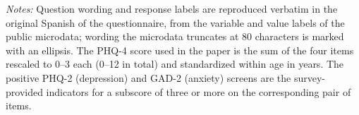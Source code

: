 \begin{table}[htbp]
\begin{threeparttable}
\begin{tabular}{@{}p{68pt}p{212pt}p{150pt}@{}}
\bottomrule
\end{tabular}
\begin{wpnotes}
\textit{Notes:} Question wording and response labels are reproduced verbatim in the original Spanish of the questionnaire, from the variable and value labels of the public microdata; wording the microdata truncates at 80 characters is marked with an ellipsis. The PHQ-4 score used in the paper is the sum of the four items rescaled to 0--3 each (0--12 in total) and standardized within age in years. The positive PHQ-2 (depression) and GAD-2 (anxiety) screens are the survey-provided indicators for a subscore of three or more on the corresponding pair of items.
\end{wpnotes}
\end{threeparttable}
\end{table}
